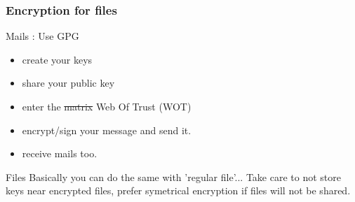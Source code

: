 \begin{frame}
\frametitle{Encryption for files}
\begin{block}{Mails : Use GPG}
\begin{itemize}
\item create your keys
\item share your public key
\item enter the \sout{matrix} Web Of Trust (WOT)
\item encrypt/sign your message and send it.
\item receive mails too.
\end{itemize}
\end{block}
\begin{block}{Files}
Basically you can do the same with 'regular file'...
Take care to not store keys near encrypted files, prefer symetrical encryption
if files will not be shared.
\end{block}
\end{frame}
